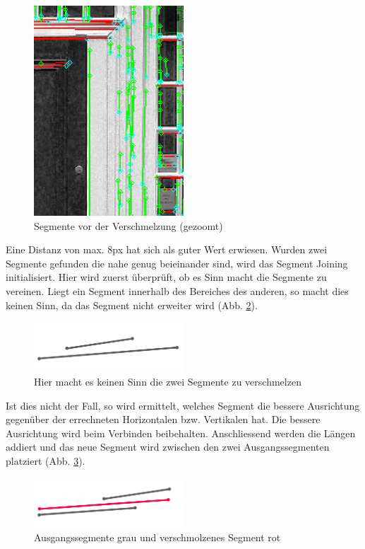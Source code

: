\begin{figure}[!ht]
\centering
\includegraphics[width=0.5\textwidth]{images/segments-pre-join} 
\caption{Segmente vor der Verschmelzung (gezoomt)}
\label{fig:segments-pre-join}
\end{figure}
\noindent
Eine Distanz von max. 8px hat sich als guter Wert erwiesen. Wurden zwei Segmente gefunden die nahe genug beieinander sind, wird das Segment Joining initialisiert. Hier wird zuerst überprüft, ob es Sinn macht die Segmente zu vereinen. Liegt ein Segment innerhalb des Bereiches des anderen, so macht dies keinen Sinn, da das Segment nicht erweiter wird (Abb. \ref{fig:segment-joining-1}).

\begin{figure}[!ht]
\centering
\includegraphics[width=0.5\textwidth]{images/segment-joining-1} 
\caption{Hier macht es keinen Sinn die zwei Segmente zu verschmelzen}
\label{fig:segment-joining-1}
\end{figure}
\noindent
Ist dies nicht der Fall, so wird ermittelt, welches Segment die bessere Ausrichtung gegenüber der errechneten Horizontalen bzw. Vertikalen hat. Die bessere Ausrichtung wird beim Verbinden beibehalten. Anschliessend werden die Längen addiert und das neue Segment wird zwischen den zwei Ausgangssegmenten platziert (Abb. \ref{fig:segment-joining-2}).

\begin{figure}[!ht]
\centering
\includegraphics[width=0.5\textwidth]{images/segment-joining-2} 
\caption{Ausgangssegmente grau und verschmolzenes Segment rot}
\label{fig:segment-joining-2}
\end{figure}

